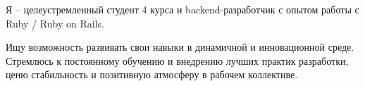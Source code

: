 \par{
Я -- целеустремленный студент 4 курса и backend-разработчик с опытом работы с Ruby / Ruby on Rails.

Ищу возможность развивать свои навыки в динамичной и инновационной среде.
Стремлюсь к постоянному обучению и внедрению лучших практик разработки, ценю стабильность и позитивную атмосферу в рабочем коллективе.
}
\vspace{1em}
